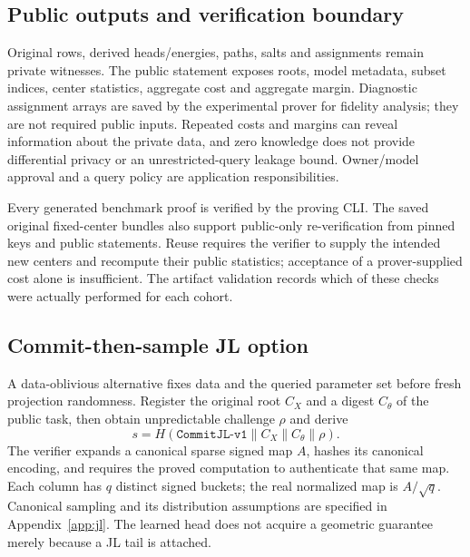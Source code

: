 \documentclass[5p,times,twocolumn]{elsarticle}
\theoremstyle{plain}
\theoremstyle{definition}
\theoremstyle{remark}
\begin{document}
\par\endgroup
\subsection{\textcolor{RevisionRed}{Public outputs and verification boundary}}
\begingroup\color{RevisionRed}
Original rows, derived heads/energies, paths, salts and assignments remain private witnesses. The public statement exposes roots, model metadata, subset indices, center statistics, aggregate cost and aggregate margin. Diagnostic assignment arrays are saved by the experimental prover for fidelity analysis; they are not required public inputs. Repeated costs and margins can reveal information about the private data, and zero knowledge does not provide differential privacy or an unrestricted-query leakage bound. Owner/model approval and a query policy are application responsibilities.


\par\endgroup
\begingroup\color{RevisionRed}
Every generated benchmark proof is verified by the proving CLI. The saved original fixed-center bundles also support public-only re-verification from pinned keys and public statements. Reuse requires the verifier to supply the intended new centers and recompute their public statistics; acceptance of a prover-supplied cost alone is insufficient. The artifact validation records which of these checks were actually performed for each cohort.


\par\endgroup
\subsection{\textcolor{RevisionRed}{Commit-then-sample JL option}}\label{sec:theory}
\begingroup\color{RevisionRed}
A data-oblivious alternative fixes data and the queried parameter set before fresh projection randomness. Register the original root $C_X$ and a digest $C_\theta$ of the public task, then obtain unpredictable challenge $\rho$ and derive
\begin{equation}
s=H(\texttt{CommitJL-v1}\|C_X\|C_\theta\|\rho).
\end{equation}
The verifier expands a canonical sparse signed map $A$, hashes its canonical encoding, and requires the proved computation to authenticate that same map. Each column has $q$ distinct signed buckets; the real normalized map is $A/\sqrt q$. Canonical sampling and its distribution assumptions are specified in Appendix~\ref{app:jl}. The learned head does not acquire a geometric guarantee merely because a JL tail is attached.
\end{document}
